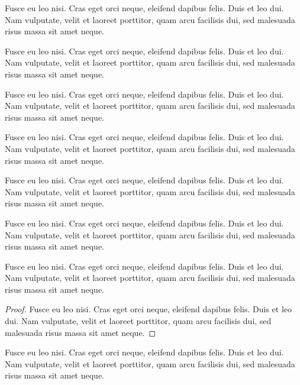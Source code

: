 \documentclass[a4paper,USenglish,cleveref,autoref,thm-restate]{lipics-v2019}
\begin{document}
\begin{example}\label{sec:testenv-example}
Fusce eu leo nisi. Cras eget orci neque, eleifend dapibus felis. Duis et leo dui. Nam vulputate, velit et laoreet porttitor, quam arcu facilisis dui, sed malesuada risus massa sit amet neque.
\end{example}

\begin{note}\label{sec:testenv-note}
Fusce eu leo nisi. Cras eget orci neque, eleifend dapibus felis. Duis et leo dui. Nam vulputate, velit et laoreet porttitor, quam arcu facilisis dui, sed malesuada risus massa sit amet neque.
\end{note}

\begin{note*}
Fusce eu leo nisi. Cras eget orci neque, eleifend dapibus felis. Duis et leo dui. Nam vulputate, velit et laoreet porttitor, quam arcu facilisis dui, sed malesuada risus massa sit amet neque.
\end{note*}

\begin{remark}\label{sec:testenv-remark}
Fusce eu leo nisi. Cras eget orci neque, eleifend dapibus felis. Duis et leo dui. Nam vulputate, velit et laoreet porttitor, quam arcu facilisis dui, sed malesuada risus massa sit amet neque.
\end{remark}

\begin{remark*}
Fusce eu leo nisi. Cras eget orci neque, eleifend dapibus felis. Duis et leo dui. Nam vulputate, velit et laoreet porttitor, quam arcu facilisis dui, sed malesuada risus massa sit amet neque.
\end{remark*}

\begin{claim}\label{sec:testenv-claim}
Fusce eu leo nisi. Cras eget orci neque, eleifend dapibus felis. Duis et leo dui. Nam vulputate, velit et laoreet porttitor, quam arcu facilisis dui, sed malesuada risus massa sit amet neque.
\end{claim}

\begin{claim*}\label{sec:testenv-claim2}
Fusce eu leo nisi. Cras eget orci neque, eleifend dapibus felis. Duis et leo dui. Nam vulputate, velit et laoreet porttitor, quam arcu facilisis dui, sed malesuada risus massa sit amet neque.
\end{claim*}

\begin{proof}
Fusce eu leo nisi. Cras eget orci neque, eleifend dapibus felis. Duis et leo dui. Nam vulputate, velit et laoreet porttitor, quam arcu facilisis dui, sed malesuada risus massa sit amet neque.
\end{proof}

\begin{claimproof}
Fusce eu leo nisi. Cras eget orci neque, eleifend dapibus felis. Duis et leo dui. Nam vulputate, velit et laoreet porttitor, quam arcu facilisis dui, sed malesuada risus massa sit amet neque.
\end{claimproof}
\end{document}
